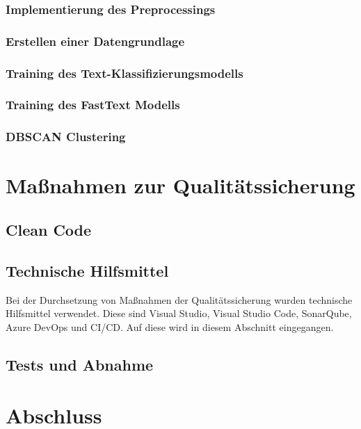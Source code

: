 \subsection{Implementierung des Preprocessings}
\label{c:implementation:preprocess}
\subsection{Erstellen einer Datengrundlage}
\label{c:implementation:data}
\subsection{Training des Text-Klassifizierungsmodells}
\label{c:implementation:classification-training}
\subsection{Training des FastText Modells}
\label{c:implementation:embedding-training}
\subsection{DBSCAN Clustering}
\label{c:implementation:clustering}





\chapter{Maßnahmen zur Qualitätssicherung}
\label{c:qs}
\section{Clean Code}
\label{c:qs:cleancode}
\section{Technische Hilfsmittel}
\label{c:qs:technical_aids}
Bei der Durchsetzung von Maßnahmen der Qualitätssicherung wurden technische Hilfsmittel verwendet. Diese sind Visual Studio, Visual Studio Code, SonarQube, Azure DevOps und CI/CD. Auf diese wird in diesem Abschnitt eingegangen.
\section{Tests und Abnahme}
\label{c:qs:tests}


\chapter{Abschluss}
\label{c:closing}

